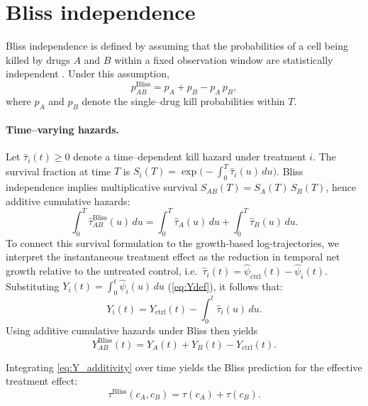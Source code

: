 \section{Bliss independence}\label{ssec:bliss}
Bliss independence is defined by assuming that the probabilities of a cell being killed by drugs \(A\) and \(B\) within a fixed observation window are statistically independent \cite{Bliss1939}.
Under this assumption,
\begin{equation}
  p_{AB}^\mathrm{Bliss}=p_A+p_B-p_A\,p_B,
  \label{eq:bliss_prob}
\end{equation}
where \(p_A\) and \(p_B\) denote the single–drug kill probabilities within \(T\).

\paragraph{Time--varying hazards.}
Let \(\hat{\tau}_i(t)\ge 0\) denote a time--dependent kill hazard under treatment \(i\).
The survival fraction at time \(T\) is \(S_i(T)=\exp\!\big(-\int_0^T\hat{\tau}_i(u)\,du\big)\).
Bliss independence implies multiplicative survival \(S_{AB}(T)=S_A(T)\,S_B(T)\), hence additive cumulative hazards:
\begin{equation}
  \int_0^T \hat{\tau}_{AB}^\mathrm{Bliss}(u)\,du=\int_0^T \hat{\tau}_A(u)\,du+\int_0^T \hat{\tau}_B(u)\,du.
  \label{eq:hazard_additivity}
\end{equation}
To connect this survival formulation to the growth-based log-trajectories, we interpret the instantaneous treatment effect as the reduction in temporal net growth relative to the untreated control, i.e.\ \(\hat{\tau}_i(t)=\hat{\psi}_{\mathrm{ctrl}}(t)-\hat{\psi}_i(t)\).
Substituting  \(Y_i(t)=\int_{0}^{t}\hat{\psi}_i(u)\,du\) (\autoref{eq:Ydef}), it follows that:
\[
  Y_i(t)=Y_{\mathrm{ctrl}}(t)-\int_0^t \hat{\tau}_i(u)\,du.
\]
Using additive cumulative hazards under Bliss then yields
\begin{equation}
  Y_{AB}^\mathrm{Bliss}(t)=Y_{A}(t)+Y_{B}(t)-Y_{\mathrm{ctrl}}(t).
  \label{eq:Y_additivity}
\end{equation}

Integrating \autoref{eq:Y_additivity} over time yields the Bliss prediction for the effective treatment effect:
\begin{equation}
  \tau^{\mathrm{Bliss}}(c_A,c_B)
  =
  \tau(c_A)
  +
  \tau(c_B).
  \label{eq:tau_eff_bliss}
\end{equation}

